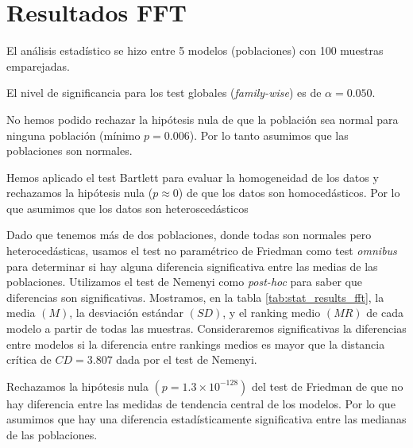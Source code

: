 \documentclass[a4paper,oneside,11pt,leqno]{article}
\begin{document}
	\section{Resultados FFT}
	\label{sec:results_fft}
	
	El análisis estadístico se hizo entre 5 modelos (poblaciones) con 100 muestras emparejadas.
	
	El nivel de significancia para los test globales (\textit{family-wise}) es de $\alpha=0.050$.
	
	No hemos podido rechazar la hipótesis nula de que la población sea normal para ninguna población (mínimo $p=0.006$). Por lo tanto asumimos que las poblaciones son normales.
	
	Hemos aplicado el test Bartlett para evaluar la homogeneidad de los datos y rechazamos la hipótesis nula ($p\approx 0$) de que los datos son homocedásticos. Por lo que asumimos que los datos son heteroscedásticos
	
	Dado que tenemos más de dos poblaciones, donde todas son normales pero heterocedásticas, usamos el test no paramétrico de Friedman como test \textit{omnibus} para determinar si hay alguna diferencia significativa entre las medias de las poblaciones. Utilizamos el test de Nemenyi como \textit{post-hoc} para saber que diferencias son significativas. Mostramos, en la tabla \ref{tab:stat_results_fft}, la media $(M)$, la desviación estándar $(SD)$, y el ranking medio $(MR)$ de cada modelo a partir de todas las muestras. Consideraremos significativas la diferencias entre modelos si la diferencia entre rankings medios es mayor que la distancia crítica de $CD=3.807$ dada por el test de Nemenyi.
	
	Rechazamos la hipótesis nula $(p=1.3\times 10^{-128})$ del test de Friedman de que no hay diferencia entre las medidas de tendencia central de los modelos. Por lo que asumimos que hay una diferencia estadísticamente significativa entre las medianas de las poblaciones.
	
\end{document}
